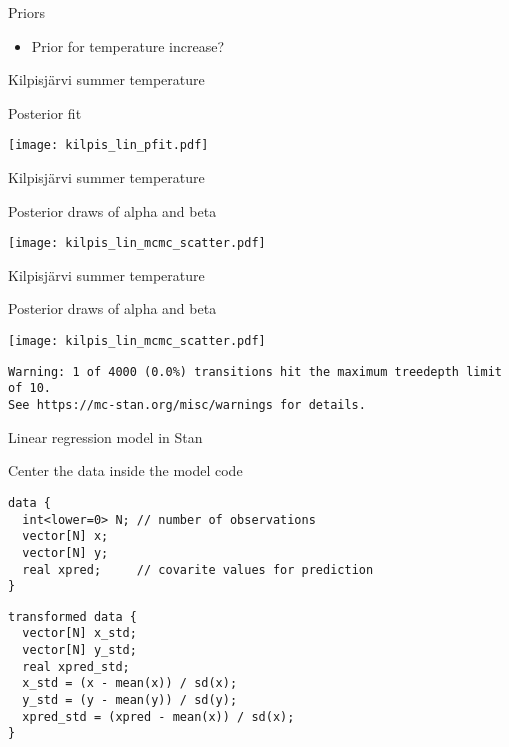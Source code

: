 \documentclass[finnish,english,t]{beamer}
\begin{document}
\begin{frame}{Priors}

  \begin{itemize}
  \item Prior for temperature increase?
  \end{itemize}

\end{frame}

\begin{frame}{Kilpisjärvi summer temperature}

  Posterior fit
  
  \begin{center}
    \texttt{[image: kilpis\_lin\_pfit.pdf]}
  \end{center}

\end{frame}

\begin{frame}{Kilpisjärvi summer temperature}

  Posterior draws of alpha and beta
  
  \begin{center}
    \texttt{[image: kilpis\_lin\_mcmc\_scatter.pdf]}
  \end{center}
 
\end{frame}

\begin{frame}[fragile]{Kilpisjärvi summer temperature}
  
  Posterior draws of alpha and beta
  
  \begin{center}
    \texttt{[image: kilpis\_lin\_mcmc\_scatter.pdf]}
  \end{center}

{\scriptsize
\begin{verbatim}
Warning: 1 of 4000 (0.0%) transitions hit the maximum treedepth limit of 10.
See https://mc-stan.org/misc/warnings for details.
\end{verbatim}
}
  
\end{frame}

\begin{frame}[fragile]{Linear regression model in Stan}

Center the data inside the model code
  
{\footnotesize
\begin{verbatim}
data {
  int<lower=0> N; // number of observations
  vector[N] x; 
  vector[N] y; 
  real xpred;     // covarite values for prediction
}
\end{verbatim}
\begin{verbatim}
transformed data {
  vector[N] x_std;
  vector[N] y_std;
  real xpred_std;
  x_std = (x - mean(x)) / sd(x);
  y_std = (y - mean(y)) / sd(y);
  xpred_std = (xpred - mean(x)) / sd(x);
}
\end{verbatim}
}
\end{frame}
\end{document}

